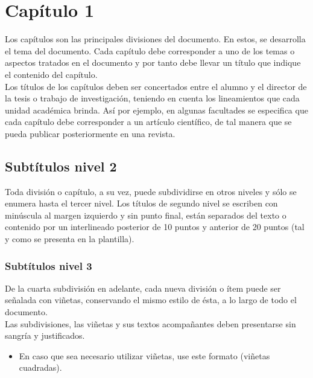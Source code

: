 \chapter{Capítulo 1}
Los capítulos son las principales divisiones del documento. En estos, se desarrolla el tema del documento. Cada capítulo debe corresponder a uno de los temas o aspectos tratados en el documento y por tanto debe llevar un título que indique el contenido del capítulo.\\

Los títulos de los capítulos deben ser concertados entre el alumno y el director de la tesis  o trabajo de investigación, teniendo en cuenta los lineamientos que cada unidad académica brinda. Así por ejemplo, en algunas facultades se especifica que cada capítulo debe corresponder a un artículo científico, de tal manera que se pueda publicar posteriormente en una revista.\\

\section{Subtítulos nivel 2}
Toda división o capítulo, a su vez, puede subdividirse en otros niveles y sólo se enumera hasta el tercer nivel. Los títulos de segundo nivel se escriben con minúscula al margen izquierdo y sin punto final, están separados del texto o contenido por un interlineado posterior de 10 puntos y anterior de 20 puntos (tal y como se presenta en la plantilla).\\

\subsection{Subtítulos nivel 3}
De la cuarta subdivisión en adelante, cada nueva división o ítem puede ser señalada con viñetas, conservando el mismo estilo de ésta, a lo largo de todo el documento.\\

Las subdivisiones, las viñetas y sus textos acompañantes deben presentarse sin sangría y justificados.\\

\begin{itemize}
\item En caso que sea necesario utilizar viñetas, use este formato (viñetas cuadradas).
\end{itemize}